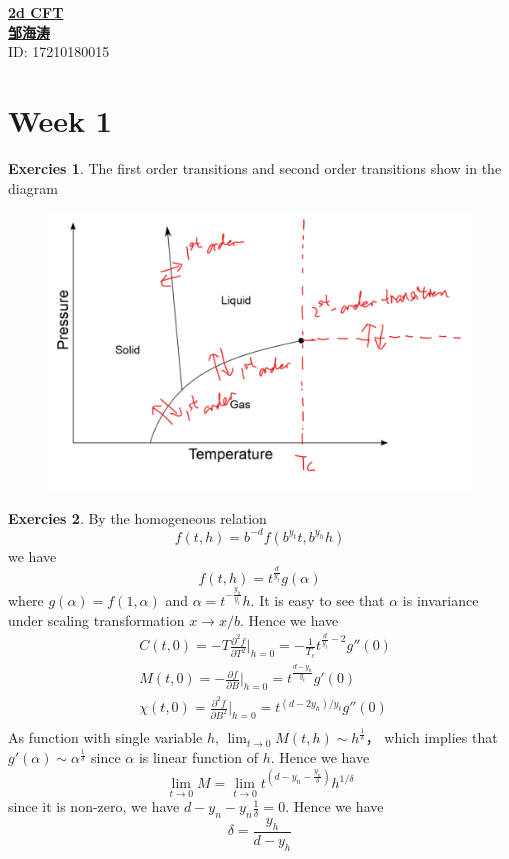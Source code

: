 \documentclass[12pt,a4paper]{article}
\theoremstyle{definition}
\newtheorem{exer}{Exercies}[subsection]
\begin{document}
\noindent
{\LARGE\underline{\textbf{2d CFT}}}\\
{\hfill\large  \underline{\textbf{邹海涛}} \\
	\hfill ID: 17210180015}\\
\section*{Week 1}
\begin{exer}
	The first order transitions and second order transitions show in the diagram
	\begin{figure}[h]
		\centering\includegraphics[scale=0.5]{PIC/hw1.png}
	\end{figure}
\end{exer}
\begin{exer}
	By the homogeneous relation
\[
f(t,h)= b^{-d}f(b^{y_t} t, b^{y_h} h)
\]
we have 
\[
f(t,h)= t^{\frac{d}{y_t}}g(\alpha)
\]
where $g(\alpha) = f(1,\alpha)$ and $\alpha = t^{-\frac{y_h}{y_t}}h$. It is easy to see that $\alpha$ is invariance under scaling transformation $x \to x/b$.
Hence we have 
\[
\begin{aligned}
&C(t,0) = -T \frac{\partial ^2 f}{\partial T ^2}\big|_{h=0} = - \frac{1}{T_c} t^{\frac{d}{y_t}-2}g''(0) \\
& M(t,0) = -\frac{\partial f}{\partial B}\big|_{h=0} =t^{\frac{d-y_h}{y_t}}g'(0)\\
& \chi(t,0) = \frac{\partial^2 f}{\partial B^2}\big|_{h=0} = t^{(d-2y_h)/y_t} g''(0)\\
\end{aligned}
\]
As function with single variable $h$, $\lim_{t \to 0}  M(t,h) \sim h^{\frac{1}{\delta}}$， which implies that $g'(\alpha) \sim \alpha^{\frac{1}{\delta}}$ since $\alpha$ is linear function of $h$. Hence we have 
\[
\lim_{t \to 0} M = \lim_{t \to 0} t^{(d-y_n - \frac{y_n}{\delta})}h ^{1/\delta}
\]
since it is non-zero, we have $d- y_n - y_n \frac{1}{\delta}=0$. Hence we have 
\[
\delta = \frac{y_h}{d-y_h}
\]	
\end{exer}
\end{document}
